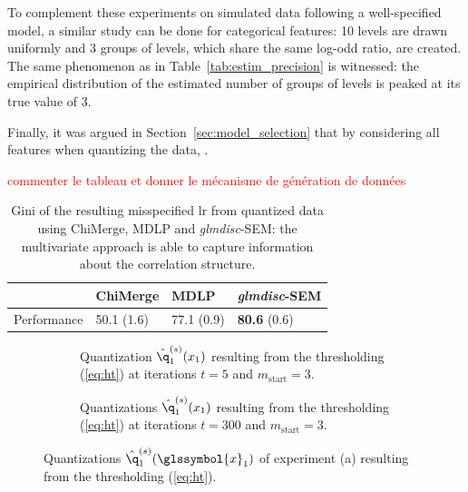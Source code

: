 To complement these experiments on simulated data following a well-specified model, a similar study can be done for categorical features: 10 levels are drawn uniformly and 3 groups of levels, which share the same log-odd ratio, are created. The same phenomenon as in Table~\ref{tab:estim_precision} is witnessed: the empirical distribution of the estimated number of groups of levels is peaked at its true value of 3.

Finally, it was argued in Section~\ref{sec:model_selection} that by considering all features when quantizing the data, .

\textcolor{red}{commenter le tableau et donner le mécanisme de génération de données}

\begin{table}[ht]
    \centering
    \caption{Gini of the resulting misspecified \gls{lr} from quantized data using ChiMerge, MDLP and \textit{glmdisc}-SEM: the multivariate approach is able to capture information about the correlation structure.}
    \label{tab:sim_false}
\begin{tabular}{llll}
 & ChiMerge & MDLP & \textit{glmdisc}-SEM \\
\hline
Performance & 50.1 (1.6) & 77.1 (0.9) & \textbf{80.6} (0.6)
\end{tabular}
\end{table}



 \newlength\figureheight
 \newlength\figurewidth
 \setlength\figureheight{4cm}
 \setlength\figurewidth{14cm}
 
  \begin{figure}[!ht]
    \centering
    \begin{subfigure}[t]{\textwidth}
        \centering
        
        \vspace{-0.5cm}
        \caption{Quantization $\hat{\q}^{(s)}_1(x_1)$ resulting from the thresholding (\ref{eq:ht}) at iterations $t = 5$ and $m_{\text{start}} = 3$.}
    \end{subfigure}%
    
    \begin{subfigure}[t]{\textwidth}
        \centering
        
        \vspace{-0.5cm}
        \caption{Quantizations $\hat{\q}^{(s)}_1(x_1)$ resulting from the thresholding (\ref{eq:ht}) at iterations $t = 300$ and $m_{\text{start}} = 3$.}
    \end{subfigure}
    
    \caption{\label{fig:MAP} Quantizations $\hat{\q}^{(s)}_1(\glssymbol{x}_1)$ of experiment (a) resulting from the thresholding (\ref{eq:ht}).}
\end{figure}

